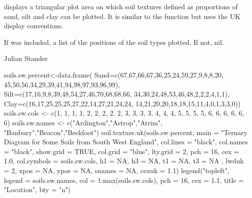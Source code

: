 \begin{Details}\relax
{} displays a triangular plot area on which soil
textures defined as proportions of sand, silt and clay can be plotted.
It is similar to the  function but uses the UK
display conventions.
\end{Details}
\begin{Value}
If  was included, a list of the 
positions of the soil types plotted. If not, nil.
\end{Value}
\begin{Author}\relax
Julian Stander
\end{Author}
\begin{SeeAlso}\relax
{}
\end{SeeAlso}
\begin{Examples}
\begin{ExampleCode}
 soils.sw.percent<-data.frame(
  Sand=c(67,67,66,67,36,25,24,59,27,9,8,8,20,
  45,50,56,34,29,39,41,94,98,97,93,96,99),
  Silt=c(17,16,9,8,39,48,54,27,46,70,68,68,66,
  34,30,24,48,53,46,48,2,2,2,4,1,1),
  Clay=c(16,17,25,25,25,27,22,14,27,21,24,24,
  14,21,20,20,18,18,15,11,4,0,1,3,3,0))
 soils.sw.cols <- c(1, 1, 1, 1, 2, 2, 2, 2, 2, 3, 3,
  3, 3, 4, 4, 4, 5, 5, 5, 5, 6, 6, 6, 6, 6, 6)
 soils.sw.names <- c("Ardington","Astrop","Atrim",
  "Banbury","Beacon","Beckfoot")
 soil.texture.uk(soils.sw.percent,
  main = "Ternary Diagram for Some Soils from South West England",
  col.lines = "black", col.names = "black", show.grid = TRUE,
  col.grid = "blue", lty.grid = 2,  pch = 16, cex = 1.0,
  col.symbols = soils.sw.cols, h1 = NA, h3 = NA, t1 = NA,
  t3 = NA , lwduk = 2, xpos = NA, ypos = NA,
  snames = NA, cexuk = 1.1)
 legend("topleft", legend = soils.sw.names, col = 1:max(soils.sw.cols),
  pch = 16, cex = 1.1, title = "Location", bty = "n")
\end{ExampleCode}
\end{Examples}

